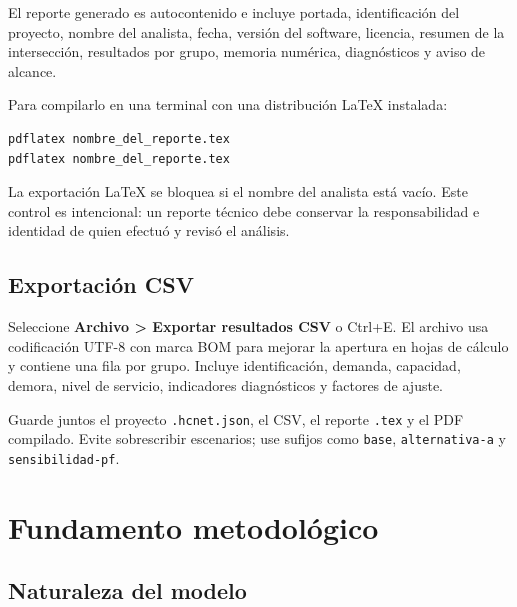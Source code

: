 \documentclass[11pt,letterpaper,oneside,openany]{report}
\begin{document}
El reporte generado es autocontenido e incluye portada, identificación del
proyecto, nombre del analista, fecha, versión del software, licencia, resumen de
la intersección, resultados por grupo, memoria numérica, diagnósticos y aviso de
alcance.

Para compilarlo en una terminal con una distribución LaTeX instalada:

\begin{lstlisting}
pdflatex nombre_del_reporte.tex
pdflatex nombre_del_reporte.tex
\end{lstlisting}

\begin{warningbox}
La exportación LaTeX se bloquea si el nombre del analista está vacío. Este control
es intencional: un reporte técnico debe conservar la responsabilidad e identidad
de quien efectuó y revisó el análisis.
\end{warningbox}

\section{Exportación CSV}

Seleccione \textbf{Archivo > Exportar resultados CSV} o Ctrl+E. El archivo usa
codificación UTF-8 con marca BOM para mejorar la apertura en hojas de cálculo y
contiene una fila por grupo. Incluye identificación, demanda, capacidad, demora,
nivel de servicio, indicadores diagnósticos y factores de ajuste.

\begin{tipbox}
Guarde juntos el proyecto \texttt{.hcnet.json}, el CSV, el reporte \texttt{.tex}
y el PDF compilado. Evite sobrescribir escenarios; use sufijos como
\texttt{base}, \texttt{alternativa-a} y \texttt{sensibilidad-pf}.
\end{tipbox}

\chapter{Fundamento metodológico}
\label{chap:metodologia}

\section{Naturaleza del modelo}
\end{document}
